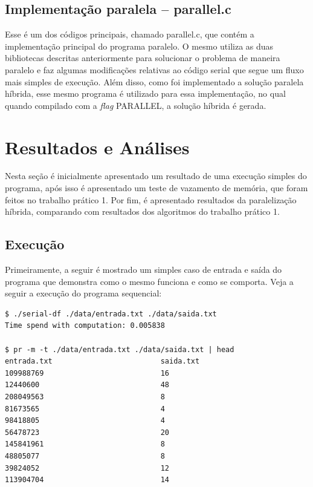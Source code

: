 \documentclass[12pt]{article}
\begin{document}
\subsection{Implementação paralela -- parallel.c}

Esse é um dos códigos principais, chamado parallel.c, que contém a implementação principal do programa paralelo. O mesmo utiliza as duas bibliotecas descritas anteriormente para solucionar o problema de maneira paralelo e faz algumas modificações relativas ao código serial que segue um fluxo mais simples de execução. Além disso, como foi implementado a solução paralela híbrida, esse mesmo programa é utilizado para essa implementação, no qual quando compilado com a \textit{flag} PARALLEL, a solução híbrida é gerada.

\section{Resultados e Análises}
\label{sec:resultados_analises}

Nesta seção é inicialmente apresentado um resultado de uma execução simples do programa, após isso é apresentado um teste de vazamento de memória, que foram feitos no trabalho prático 1. Por fim, é apresentado resultados da paralelização híbrida, comparando com resultados dos algoritmos do trabalho prático 1.

\subsection{Execução}

Primeiramente, a seguir é mostrado um simples caso de entrada e saída do programa que demonstra como o mesmo funciona e como se comporta. Veja a seguir a execução do programa sequencial:

\begin{verbatim}
$ ./serial-df ./data/entrada.txt ./data/saida.txt  
Time spend with computation: 0.005838

$ pr -m -t ./data/entrada.txt ./data/saida.txt | head
entrada.txt                         saida.txt
109988769                           16
12440600                            48
208049563                           8
81673565                            4
98418805                            4
56478723                            20
145841961                           8
48805077                            8
39824052                            12
113904704                           14
\end{verbatim}
\end{document}
